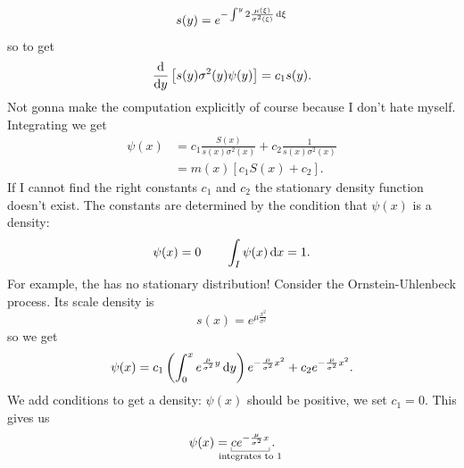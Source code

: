 \documentclass[12pt]{report}
\begin{document}
\begin{equation*}
	s(y)=e^{-\int^{y}2\frac{\mu(\xi)}{\sigma^{2}(\xi)}\mathop{}\!\mathrm{d}\xi}
\end{equation*}
so to get
\begin{equation*}
	\frac{\mathop{}\!\mathrm{d}}{\mathop{}\!\mathrm{d} y}\left[s(y)\sigma^{2}(y)\psi(y)\right]=c_{1}s(y).
\end{equation*}
Not gonna make the computation explicitly of course because I don't hate myself. Integrating we get
\begin{align*}
	\psi(x)&=c_{1}\frac{S(x)}{s(x)\sigma^{2}(x)}+c_{2}\frac{1}{s(x)\sigma^{2}(x)}\\
	&=m(x)\left[c_{1}S(x)+c_{2}\right].
\end{align*}
If I cannot find the right constants $c_{1}$ and $c_{2}$ the stationary density function doesn't exist. The constants are determined by the condition that $\psi(x)$ is a density:
\begin{equation*}
	\psi(x)=0\qquad\int_{I}\psi(x)\mathop{}\!\mathrm{d} x=1.
\end{equation*}
For example, the \bwm{} has no stationary distribution! 
Consider the Ornstein-Uhlenbeck process. Its scale density is
\begin{equation*}
	s(x)=e^{\mu\frac{x^{2}}{\sigma^{2}}}
\end{equation*}
so we get
\begin{equation*}
	\psi(x)=c_{1}\left(\int_{0}^{x}e^{\frac{\mu}{\sigma^{2}}y}\mathop{}\!\mathrm{d} y\right)e^{-\frac{\mu}{\sigma^{2}}x^{2}}+c_{2}e^{-\frac{\mu}{\sigma^{2}}x^{2}}.
\end{equation*}
We add conditions to get a density: $\psi(x)$ should be positive, we set $c_{1}=0$. This gives us
\begin{equation*}
	\psi(x)=\ubracketthin{ce^{-\frac{\mu}{\sigma^{2}}x}}_{\claptext{integrates to 1}}.
\end{equation*}
\end{document}
